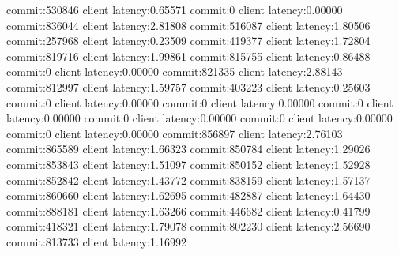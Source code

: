 commit:530846 client latency:0.65571
commit:0 client latency:0.00000
commit:836044 client latency:2.81808
commit:516087 client latency:1.80506
commit:257968 client latency:0.23509
commit:419377 client latency:1.72804
commit:819716 client latency:1.99861
commit:815755 client latency:0.86488
commit:0 client latency:0.00000
commit:821335 client latency:2.88143
commit:812997 client latency:1.59757
commit:403223 client latency:0.25603
commit:0 client latency:0.00000
commit:0 client latency:0.00000
commit:0 client latency:0.00000
commit:0 client latency:0.00000
commit:0 client latency:0.00000
commit:0 client latency:0.00000
commit:856897 client latency:2.76103
commit:865589 client latency:1.66323
commit:850784 client latency:1.29026
commit:853843 client latency:1.51097
commit:850152 client latency:1.52928
commit:852842 client latency:1.43772
commit:838159 client latency:1.57137
commit:860660 client latency:1.62695
commit:482887 client latency:1.64430
commit:888181 client latency:1.63266
commit:446682 client latency:0.41799
commit:418321 client latency:1.79078
commit:802230 client latency:2.56690
commit:813733 client latency:1.16992